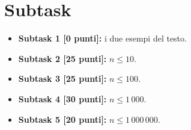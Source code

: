 \section*{Subtask}

  \begin{itemize}
    \item \textbf{Subtask 1 [0 punti]:} i due esempi del testo.
    \item \textbf{Subtask 2 [25 punti]:} $n \leq 10$.
    \item \textbf{Subtask 3 [25 punti]:} $n \leq 100$.
    \item \textbf{Subtask 4 [30 punti]:} $n \leq 1\,000$.
    \item \textbf{Subtask 5 [20 punti]:} $n \leq 1\,000\,000$.
  \end{itemize}
  
